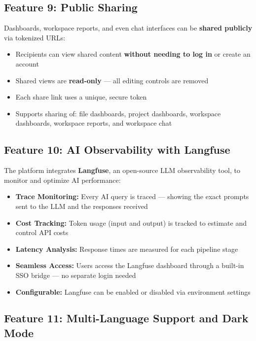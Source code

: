 \documentclass[12pt,a4paper]{report}
\begin{document}
\subsection{Feature 9: Public Sharing}

Dashboards, workspace reports, and even chat interfaces can be \textbf{shared publicly} via tokenized URLs:

\begin{itemize}[leftmargin=1.5cm]
    \item Recipients can view shared content \textbf{without needing to log in} or create an account
    \item Shared views are \textbf{read-only} --- all editing controls are removed
    \item Each share link uses a unique, secure token
    \item Supports sharing of: file dashboards, project dashboards, workspace dashboards, workspace reports, and workspace chat
\end{itemize}

\subsection{Feature 10: AI Observability with Langfuse}

The platform integrates \textbf{Langfuse}, an open-source LLM observability tool, to monitor and optimize AI performance:

\begin{itemize}[leftmargin=1.5cm]
    \item \textbf{Trace Monitoring:} Every AI query is traced --- showing the exact prompts sent to the LLM and the responses received
    \item \textbf{Cost Tracking:} Token usage (input and output) is tracked to estimate and control API costs
    \item \textbf{Latency Analysis:} Response times are measured for each pipeline stage
    \item \textbf{Seamless Access:} Users access the Langfuse dashboard through a built-in SSO bridge --- no separate login needed
    \item \textbf{Configurable:} Langfuse can be enabled or disabled via environment settings
\end{itemize}

\subsection{Feature 11: Multi-Language Support and Dark Mode}
\end{document}
